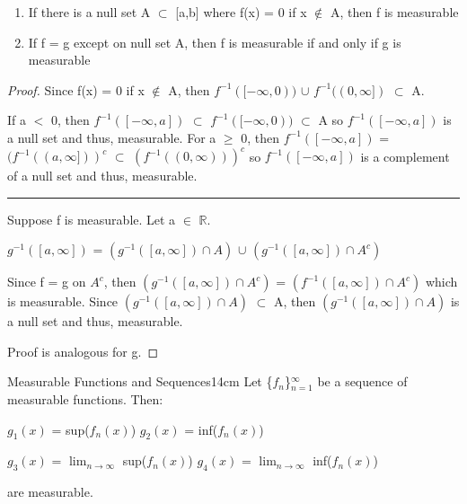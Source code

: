     \begin{enumerate}[label=(\alph*), leftmargin=2cm, itemsep=0.1cm]
        \item  If there is a null set A $\subset$ [a,b] where f(x) = 0 if
            x $\not \in$ A, then f is measurable

        \item If f = g except on null set A, then f is measurable if and only if
            g is measurable
    \end{enumerate}

    \begin{proof}
        Since f(x) = 0 if x $\not \in$ A, then
        $f^{-1}([-\infty,0))$ $\cup$ $f^{-1}((0,\infty])$ $\subset$ A.

        If a $<$ 0, then $f^{-1}([-\infty,a])$ $\subset$ $f^{-1}([-\infty,0))$
        $\subset$ A so $f^{-1}([-\infty,a])$ is a null set and thus,
        measurable.
        For a $\geq$ 0, then $f^{-1}([-\infty,a])$
        = $(f^{-1}((a,\infty]))^c$ $\subset$ $(f^{-1}((0,\infty)))^c$
        so $f^{-1}([-\infty,a])$ is a complement of a null set and thus,
        measurable.

        \rule[0.1cm]{15.2cm}{0.01cm}

        Suppose f is measurable. Let a $\in$ $\mathbb{R}$.

        \hspace{0.5cm}
        $g^{-1}([a,\infty])$
        = $(g^{-1}([a,\infty]) \cap A)$ $\cup$ $(g^{-1}([a,\infty]) \cap A^c)$

        Since f = g on $A^c$, then
        $(g^{-1}([a,\infty]) \cap A^c)$
        = $(f^{-1}([a,\infty]) \cap A^c)$ which is measurable.
        Since $(g^{-1}([a,\infty]) \cap A)$ $\subset$ A, then
        $(g^{-1}([a,\infty]) \cap A)$ is a null set and thus, measurable.

        Proof is analogous for g.
    \end{proof}

    \vspace{0.5cm}



    \begin{wtheorem}{Measurable Functions and Sequences}{14cm}
        Let \{$f_n$\}$_{n=1}^{\infty}$ be a sequence of measurable functions.
        Then:

        \hspace{0.5cm}
        $g_1(x)$ = sup($f_n(x)$)
        \hspace{2.5cm}
        $g_2(x)$ = inf($f_n(x)$)

        \hspace{0.5cm}
        $g_3(x)$ = $\lim_{n \rightarrow \infty}$ sup($f_n(x)$)
        \hspace{1cm}
        $g_4(x)$ = $\lim_{n \rightarrow \infty}$ inf($f_n(x)$)

        are measurable.
    \end{wtheorem}

